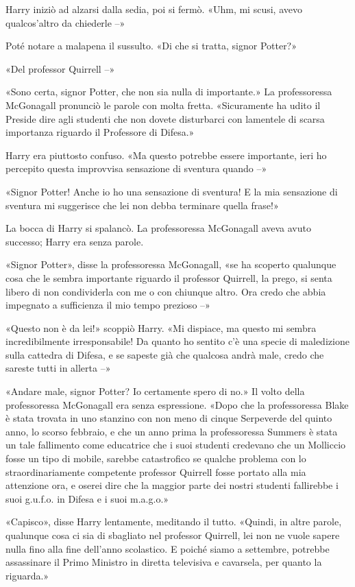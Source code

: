 Harry iniziò ad alzarsi dalla sedia, poi si fermò. «Uhm, mi scusi, avevo qualcos’altro da chiederle –»

Poté notare a malapena il sussulto. «Di che si tratta, signor Potter?»

«Del professor Quirrell –»

«Sono certa, signor Potter, che non sia nulla di importante.» La professoressa McGonagall pronunciò le parole con molta fretta. «Sicuramente ha udito il Preside dire agli studenti che non dovete disturbarci con lamentele di scarsa importanza riguardo il Professore di Difesa.»

Harry era piuttosto confuso. «Ma questo potrebbe essere importante, ieri ho percepito questa improvvisa sensazione di sventura quando –»

«Signor Potter! Anche io ho una sensazione di sventura! E la mia sensazione di sventura mi suggerisce che lei non debba terminare quella frase!»

La bocca di Harry si spalancò. La professoressa McGonagall aveva avuto successo; Harry era senza parole.

«Signor Potter», disse la professoressa McGonagall, «se ha scoperto qualunque cosa che le sembra importante riguardo il professor Quirrell, la prego, si senta libero di non condividerla con me o con chiunque altro. Ora credo che abbia impegnato a sufficienza il mio tempo prezioso –»

«Questo non è da lei!» scoppiò Harry. «Mi dispiace, ma questo mi sembra incredibilmente irresponsabile! Da quanto ho sentito c’è una specie di maledizione sulla cattedra di Difesa, e se sapeste già che qualcosa andrà male, credo che sareste tutti in allerta –»

«Andare male, signor Potter? Io certamente spero di no.» Il volto della professoressa McGonagall era senza espressione. «Dopo che la professoressa Blake è stata trovata in uno stanzino con non meno di cinque Serpeverde del quinto anno, lo scorso febbraio, e che un anno prima la professoressa Summers è stata un tale fallimento come educatrice che i suoi studenti credevano che un Molliccio fosse un tipo di mobile, sarebbe catastrofico se qualche problema con lo straordinariamente competente professor Quirrell fosse portato alla mia attenzione ora, e oserei dire che la maggior parte dei nostri studenti fallirebbe i suoi g.u.f.o. in Difesa e i suoi m.a.g.o.»

«Capisco», disse Harry lentamente, meditando il tutto. «Quindi, in altre parole, qualunque cosa ci sia di sbagliato nel professor Quirrell, lei non ne vuole sapere nulla fino alla fine dell’anno scolastico. E poiché siamo a settembre, potrebbe assassinare il Primo Ministro in diretta televisiva e cavarsela, per quanto la riguarda.»

